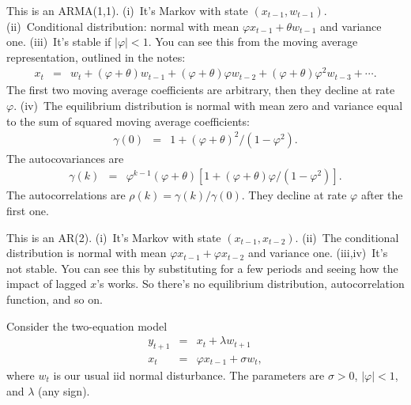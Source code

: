 \documentclass[11pt]{exam}
\begin{document}
\begin{questions}
\begin{solution}
\begin{parts}
\item This is an ARMA(1,1).
(i)~It's Markov with state $(x_{t-1}, w_{t-1})$.
(ii)~Conditional distribution:  normal with mean $\varphi x_{t-1} + \theta w_{t-1}$ and variance one.
(iii)~It's stable if $|\varphi| < 1$.
You can see this from the moving average representation, outlined in the notes:
\begin{eqnarray*}
    x_t &=&   w_t + (\varphi+ \theta) w_{t-1}
                + (\varphi+ \theta)\varphi w_{t-2}
                +  (\varphi+ \theta)\varphi^2 w_{t-3} + \cdots .
\end{eqnarray*}
The first two moving average coefficients are arbitrary,
then they decline at rate $\varphi$.
(iv)~The equilibrium distribution is normal with mean zero and variance
equal to the sum of squared moving average coefficients:
\begin{eqnarray*}
    \gamma(0) &=& 1 + (\varphi + \theta)^2/(1-\varphi^2) .
\end{eqnarray*}
The autocovariances are
\begin{eqnarray*}
    \gamma(k) &=& \varphi^{k-1} (\varphi + \theta)
            \left[1 + (\varphi+\theta)\varphi/(1-\varphi^2) \right].
\end{eqnarray*}
The autocorrelations are $\rho(k) = \gamma(k)/\gamma(0)$.
They decline at rate $\varphi$ after the first one.

\item This is an AR(2).
(i)~It's Markov with state $(x_{t-1},x_{t-2})$.
(ii)~The conditional distribution is normal with mean $\varphi x_{t-1} + \varphi x_{t-2}$
and variance one.
(iii,iv)~It's not stable.  You can see this by substituting for a few periods and
seeing how the impact of lagged $x$'s works.  So there's no equilibrium distribution,
autocorrelation function, and so on.

\end{parts}
\end{solution}

Consider the two-equation model
\begin{eqnarray*}
    y_{t+1}   &=&  x_t + \lambda w_{t+1} \\
    x_{t}     &=& \varphi x_{t-1} + \sigma w_{t}  ,
\end{eqnarray*}
where $w_t$ is our usual iid normal disturbance.
The parameters are $\sigma>0$, $| \varphi| < 1$, and $\lambda$ (any sign).


\end{questions}
\end{document}
